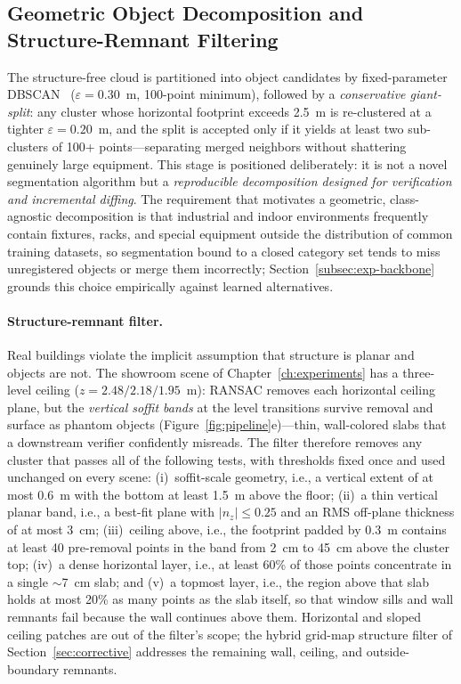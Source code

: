 \subsection{Geometric Object Decomposition and Structure-Remnant Filtering}
\label{subsec:decomposition}

The structure-free cloud is partitioned into object candidates by
fixed-parameter DBSCAN~\cite{ester1996dbscan} ($\varepsilon=0.30$~m, 100-point
minimum), followed by a \emph{conservative giant-split}: any cluster whose
horizontal footprint exceeds 2.5~m is re-clustered at a tighter
$\varepsilon=0.20$~m, and the split is accepted only if it yields at least two
sub-clusters of 100+ points---separating merged neighbors without shattering
genuinely large equipment. This stage is positioned deliberately: it is not a
novel segmentation algorithm but a \emph{reproducible decomposition designed
for verification and incremental diffing}. The requirement that motivates a
geometric, class-agnostic decomposition is that industrial and indoor
environments frequently contain fixtures, racks, and special equipment outside
the distribution of common training datasets, so segmentation bound to a
closed category set tends to miss unregistered objects or merge them
incorrectly; Section~\ref{subsec:exp-backbone} grounds this choice empirically
against learned alternatives.

\paragraph{Structure-remnant filter.}
Real buildings violate the implicit assumption that structure is planar and
objects are not. The showroom scene of Chapter~\ref{ch:experiments} has a
three-level ceiling ($z=2.48/2.18/1.95$~m): RANSAC removes each horizontal
ceiling plane, but the \emph{vertical soffit bands} at the level transitions
survive removal and surface as phantom objects
(Figure~\ref{fig:pipeline}e)---thin, wall-colored slabs that a downstream
verifier confidently misreads. The filter therefore removes any cluster that
passes all of the following tests, with thresholds fixed once and used
unchanged on every scene: (i)~soffit-scale geometry, i.e., a vertical extent
of at most 0.6~m with the bottom at least 1.5~m above the floor; (ii)~a thin
vertical planar band, i.e., a best-fit plane
with $|n_z|\le0.25$ and an RMS off-plane thickness of at most 3~cm;
(iii)~ceiling above, i.e., the footprint padded by 0.3~m contains at least 40
pre-removal points in the band from 2~cm to 45~cm above the cluster top;
(iv)~a dense horizontal layer, i.e., at least 60\% of those points concentrate
in a single $\sim$7~cm slab; and (v)~a topmost layer, i.e., the region above
that slab holds at most 20\% as many points as the slab itself, so that window
sills and wall remnants fail because the wall continues above them. Horizontal
and sloped ceiling patches are out of the filter's scope; the hybrid grid-map
structure filter of Section~\ref{sec:corrective} addresses the remaining wall,
ceiling, and outside-boundary remnants.

